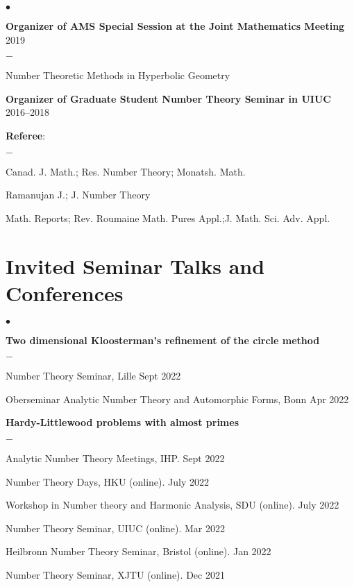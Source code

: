 \documentclass[margin,line,pifont,palatino,courier,10pt]{res}
\newenvironment{list1}{
  \begin{list}{$\bullet$}{%
      \setlength{\itemsep}{0in}
      \setlength{\parsep}{0in} \setlength{\parskip}{0in}
      \setlength{\topsep}{0in} \setlength{\partopsep}{0in}
      \setlength{\leftmargin}{0.17in}}}{\end{list}}
\newenvironment{list2}{
  \begin{list}{$-$}{%
      \setlength{\itemsep}{0in}
      \setlength{\parsep}{0in} \setlength{\parskip}{0in}
      \setlength{\topsep}{0in} \setlength{\partopsep}{0in}
      \setlength{\leftmargin}{0.2in}}}{\end{list}}
\begin{document}
\begin{resume}
\begin{list1}
	\item \textbf{Organizer of AMS Special Session at the Joint Mathematics Meeting} {\hfill   2019}
	
	\begin{list2}
		\item Number Theoretic Methods in Hyperbolic Geometry 
	\end{list2}
	\item \textbf{Organizer of Graduate Student Number Theory Seminar in UIUC} {\hfill 2016--2018}
	\item \textbf{Referee}: 
	\begin{list2}
		\item Canad. J. Math.;  Res. Number Theory; Monatsh. Math. \item Ramanujan J.; J. Number Theory
		\item Math. Reports; Rev. Roumaine Math. Pures Appl.;J. Math. Sci. Adv. Appl.
	\end{list2}
	
\end{list1}

\section{\sc Invited Seminar Talks and \\Conferences }

\begin{list1}
\item \textbf{Two dimensional Kloosterman's refinement of the circle method}
		\begin{list2}
			\item {Number Theory Seminar, Lille }{\hfill Sept 2022}
			\item {Oberseminar Analytic Number Theory and Automorphic Forms, Bonn }{\hfill Apr 2022}
		\end{list2}
\item \textbf{Hardy-Littlewood problems with almost primes}
\begin{list2}
	\item {Analytic Number Theory Meetings, IHP}. {\hfill Sept 2022}
	\item {Number Theory Days, HKU (online)}. {\hfill July 2022}
	\item {Workshop in Number theory and Harmonic Analysis, SDU (online)}. {\hfill July 2022}
	\item {Number Theory Seminar, UIUC (online)}. {\hfill Mar 2022}
	\item {Heilbronn Number Theory Seminar, Bristol (online)}. {\hfill Jan 2022}
	\item {Number Theory Seminar, XJTU (online)}. {\hfill Dec 2021}
\end{list2}


\end{list1}
\end{resume}
\end{document}
